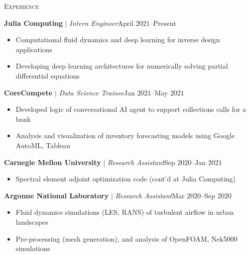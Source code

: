 \documentclass[10pt]{article}
\begin{document}
\begin{multicols}{2}
\textsc{Experience}
\columnbreak

\textbf{Julia Computing} $|$ \textit{Intern Engineer}\hfill April $2021$--Present

\vspace{-1.75em}
\begin{itemize}[label=-,leftmargin=1.0em]
    \setlength\itemsep{-0.25em}
    \item Computational fluid dynamics and deep learning for inverse design applications
    \item Developing deep learning architectures for numerically solving partial differential equations
\end{itemize}
\vspace{-2.0em}

\vspace{0.5em}
%
\textbf{CoreCompete} $|$ \textit{Data Science Trainee}\hfill Jan $2021$--May $2021$

\vspace{-1.75em}
\begin{itemize}[label=-,leftmargin=1.0em]
    \setlength\itemsep{-0.25em}
    \item Developed logic of conversational AI agent to support collections calls for a bank
    \item Analysis and visualization of inventory forecasting models using Google AutoML, Tableau
\end{itemize}
\vspace{-2.0em}

\vspace{0.5em}
%
\textbf{Carnegie Mellon University} $|$ \textit{Research Assistant}\hfill Sep $2020$--Jan $2021$

\vspace{-1.75em}
\begin{itemize}[label=-,leftmargin=1.0em]
    \setlength\itemsep{-0.25em}
    \item Spectral element adjoint optimization code %
    (cont'd at Julia Computing)
\end{itemize}
\vspace{-2.0em}

\vspace{0.5em}
%
\textbf{Argonne National Laboratory} $|$ \textit{Research Assistant}\hfill Mar $2020$--Sep $2020$

\vspace{-1.75em}
\begin{itemize}[label=-,leftmargin=1.0em]
    \setlength\itemsep{-0.25em}
    \item Fluid dynamics simulations (LES, RANS) of turbulent airflow in urban landscapes
    \item Pre-processing (mesh generation), and analysis of OpenFOAM, Nek5000 simulations
\end{itemize}
\vspace{-2.0em}


\end{multicols}
\end{document}
